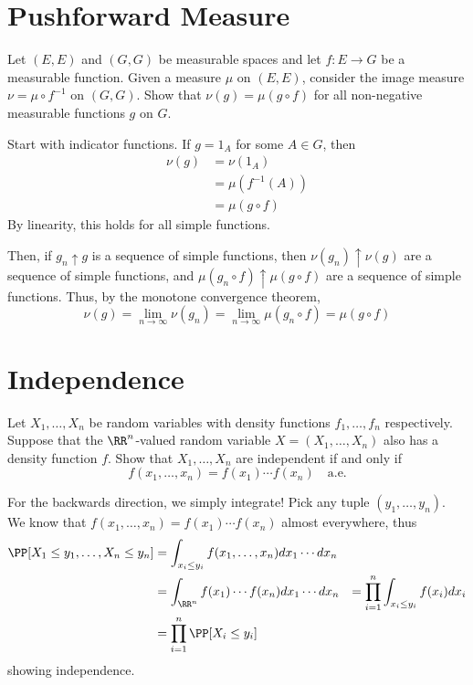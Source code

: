 \documentclass[11pt, headheight=30pt]{scrartcl}
\begin{document}
\section{Pushforward Measure}
\begin{prob}
    Let $(E, E)$ and $(G, G)$ be measurable spaces and let $f : E \to G$ be a measurable function. Given a measure $\mu$ on $(E, E)$, consider the image measure $\nu = \mu \circ f^{-1}$ on $(G, G)$.
    Show that $\nu(g) = \mu(g \circ f)$ for all non-negative measurable functions $g$ on $G$.
\end{prob}

Start with indicator functions. If $g = 1_A$ for some $A\in G$,
then
\begin{align*}
    \nu(g) &= \nu(1_A)\\
    &= \mu(f^{-1}(A))\\
    &= \mu(g\circ f)
\end{align*}
By linearity, this holds for all simple functions.

Then, if $g_n\uparrow g$ is a sequence of simple functions,
then $\nu(g_n)\uparrow \nu(g)$ are a sequence of simple functions,
and $\mu(g_n\circ f)\uparrow \mu(g\circ f)$ are a sequence of simple functions.
Thus, by the monotone convergence theorem,
\[
    \nu(g) = \lim_{n\to \infty} \nu(g_n) = \lim_{n\to \infty} \mu(g_n\circ f) = \mu(g\circ f)    
\]

\section{Independence}
\begin{prob}
    Let $X_1, \ldots , X_n$ be random variables with density functions $f_1, \ldots , f_n$ respectively.
    Suppose that the $\RR^n$-valued random variable $X = (X_1, \ldots , X_n)$ also has a density function $f$. Show
    that $X_1, \ldots , X_n$ are independent if and only if
    \[
        f(x_1, \ldots , x_n) = f(x_1) \cdots f(x_n) \quad \text{a.e.}
    \]
\end{prob}
For the backwards direction, we simply integrate! Pick
any tuple $(y_1, \dots, y_n)$. We know
that $f(x_1, \dots, x_n) = f(x_1)\cdots f(x_n)$ almost everywhere,
thus
\begin{align*}
    \PP[X_1\leq y_1, \dots, X_n\leq y_n] &= \int_{x_i\leq y_i} f(x_1, \dots, x_n)dx_1\cdots dx_n\\
    &= \int_{\RR^n} f(x_1)\cdots f(x_n)dx_1\cdots dx_n
    &= \prod_{i=1}^n \int_{x_i\leq y_i} f(x_i)dx_i\\
    &= \prod_{i=1}^n \PP[X_i\leq y_i]
\end{align*}
showing independence.
\end{document}
